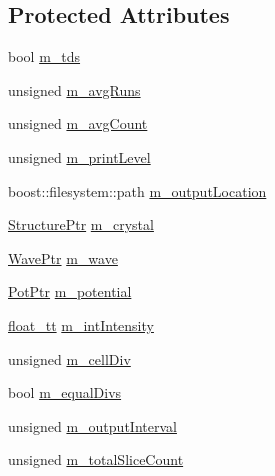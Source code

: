 \subsection*{Protected Attributes}
\begin{DoxyCompactItemize}
\item 
bool \hyperlink{class_q_s_t_e_m_1_1_c_experiment_base_a051c3e8c0ca249dffcb99917b14ed8ab}{m\-\_\-tds}
\item 
unsigned \hyperlink{class_q_s_t_e_m_1_1_c_experiment_base_acc50aeea50f3aa528fd6ad33ed224559}{m\-\_\-avg\-Runs}
\item 
unsigned \hyperlink{class_q_s_t_e_m_1_1_c_experiment_base_a42472805cae3d7c91c0411cef287efd1}{m\-\_\-avg\-Count}
\item 
unsigned \hyperlink{class_q_s_t_e_m_1_1_c_experiment_base_a6d9d825daf4021a868e29afaea0aee9e}{m\-\_\-print\-Level}
\item 
boost\-::filesystem\-::path \hyperlink{class_q_s_t_e_m_1_1_c_experiment_base_aad5ad29836b8f1bcfa1475062fe34cda}{m\-\_\-output\-Location}
\item 
\hyperlink{namespace_q_s_t_e_m_a7ab0b6bb11e12c9829540e6d872946fc}{Structure\-Ptr} \hyperlink{class_q_s_t_e_m_1_1_c_experiment_base_ab062414fe8f7aef9aad2d070e9130bac}{m\-\_\-crystal}
\item 
\hyperlink{namespace_q_s_t_e_m_ab42c5fe058973736465964e84b504b74}{Wave\-Ptr} \hyperlink{class_q_s_t_e_m_1_1_c_experiment_base_aab50b5afb7b9387ec1c74d0e11fcbce4}{m\-\_\-wave}
\item 
\hyperlink{namespace_q_s_t_e_m_ae5a1cfb98b70a68e1c9b3fd1f50ab4b5}{Pot\-Ptr} \hyperlink{class_q_s_t_e_m_1_1_c_experiment_base_af7edadc137c6ca92c1b66e4d5fedb50d}{m\-\_\-potential}
\item 
\hyperlink{namespace_q_s_t_e_m_a915d7caa497280d9f927c4ce8d330e47}{float\-\_\-tt} \hyperlink{class_q_s_t_e_m_1_1_c_experiment_base_ae5f965841a4ceba2d168ef30bbd1cb49}{m\-\_\-int\-Intensity}
\item 
unsigned \hyperlink{class_q_s_t_e_m_1_1_c_experiment_base_a558d18e58e3b66bc50e5c1ca8de0be2b}{m\-\_\-cell\-Div}
\item 
bool \hyperlink{class_q_s_t_e_m_1_1_c_experiment_base_ac3826792df95fdbd7dd47d45a4da9cfc}{m\-\_\-equal\-Divs}
\item 
unsigned \hyperlink{class_q_s_t_e_m_1_1_c_experiment_base_aab9ed4dcfb7471cf39640ee6882b4d25}{m\-\_\-output\-Interval}
\item 
unsigned \hyperlink{class_q_s_t_e_m_1_1_c_experiment_base_a822e2b526bf15d944265a05eb9c7680c}{m\-\_\-total\-Slice\-Count}

\end{DoxyCompactItemize}
